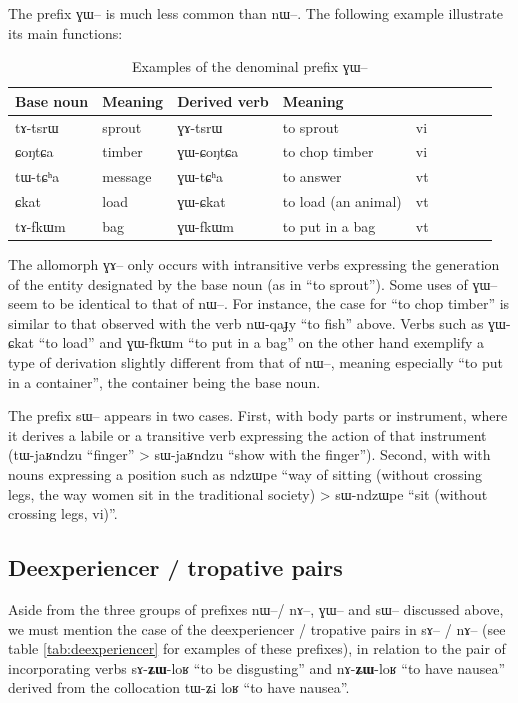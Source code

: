 \documentclass[oldfontcommands,oneside,a4paper,11pt]{article}
\newcommand{\ipa}[1]{{\phon #1}} %
\begin{document}

The prefix \ipa{ɣɯ}-- is much less common than \ipa{nɯ}--. The following example illustrate its main functions:
\begin{table}[H] \centering
\caption{Examples of the denominal prefix \ipa{ɣɯ}--}\label{tab:denom.pref.GW} 
\begin{tabular}{lllllllll} \toprule
Base noun& Meaning & Derived verb & Meaning & \\
\midrule
\ipa{tɤ-tsrɯ} &sprout & \ipa{ɣɤ-tsrɯ} & to sprout&vi\\
\ipa{ɕoŋtɕa} &timber & \ipa{ɣɯ-ɕoŋtɕa} & to chop timber &vi \\
\ipa{tɯ-tɕʰa} & message & \ipa{ɣɯ-tɕʰa} & to answer &vt \\
\ipa{ɕkat} &load & \ipa{ɣɯ-ɕkat} & to load (an animal) &vt \\
\ipa{tɤ-fkɯm} &bag & \ipa{ɣɯ-fkɯm} & to put in a bag &vt \\
    \bottomrule
\end{tabular}
\end{table}
The allomorph \ipa{ɣɤ}-- only occurs with intransitive verbs expressing the generation of the entity designated by the base noun (as in ``to sprout''). Some uses of \ipa{ɣɯ}-- seem to be identical to that of \ipa{nɯ}--. For instance, the case for ``to chop timber''  is similar to that observed with the verb \ipa{nɯ-qaɟy} ``to fish'' above. Verbs such as \ipa{ɣɯ-ɕkat} ``to load'' and \ipa{ɣɯ-fkɯm} ``to put in a bag'' on the other hand exemplify a type of derivation slightly different from that of \ipa{nɯ}--, meaning especially ``to put in a container'', the container being the base noun.


The prefix \ipa{sɯ}-- appears in two cases. First, with body parts or instrument, where it derives a labile or a transitive verb expressing the action of that instrument (\ipa{tɯ-jaʁndzu} ``finger'' > \ipa{sɯ-jaʁndzu} ``show with the finger''). Second, with  with nouns expressing a position such as \ipa{ndzɯpe} ``way of sitting (without crossing legs, the way women sit in the traditional society) > \ipa{sɯ-ndzɯpe} ``sit (without crossing legs, vi)''.

  
  
  
\subsection{Deexperiencer / tropative pairs}
Aside from the three groups of prefixes \ipa{nɯ}--/ \ipa{nɤ}--, \ipa{ɣɯ}-- and  \ipa{sɯ}-- discussed above, we must mention the case of the deexperiencer / tropative pairs in \ipa{sɤ}-- / \ipa{nɤ}-- (see table \ref{tab:deexperiencer} for examples of these prefixes), in relation to the pair of incorporating verbs \ipa{sɤ-\textbf{ʑɯ}-loʁ} ``to be disgusting'' and \ipa{nɤ-\textbf{ʑɯ}-loʁ} ``to have nausea'' derived from the collocation     \ipa{tɯ-ʑi}  \ipa{loʁ} ``to have nausea''.
\end{document}

